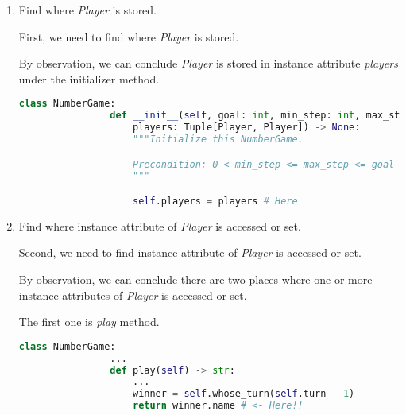 \documentclass[12pt]{article}
\begin{document}
\begin{enumerate}[1.]
\begin{mdframed}
        \begin{enumerate}[1.]
            \item Find where \textit{Player} is stored.

            \bigskip

            \begin{mdframed}

            First, we need to find where \textit{Player} is stored.

            \bigskip

            By observation, we can conclude \textit{Player} is stored in
            instance attribute \textit{players} under the initializer method.

            \begin{lstlisting}[language=Python]
            class NumberGame:
                def __init__(self, goal: int, min_step: int, max_step: int,
                    players: Tuple[Player, Player]) -> None:
                    """Initialize this NumberGame.

                    Precondition: 0 < min_step <= max_step <= goal
                    """

                    self.players = players # Here
            \end{lstlisting}


            \end{mdframed}

            \item Find where instance attribute of \textit{Player} is accessed or set.

            \bigskip

            \begin{mdframed}

            Second, we need to find instance attribute of \textit{Player} is accessed or set.

            \bigskip

            By observation, we can conclude there are two places where one or more instance
            attributes of \textit{Player} is accessed or set.

            \bigskip

            The first one is \textit{play} method.

            \begin{lstlisting}[language=Python]
            class NumberGame:
                ...
                def play(self) -> str:
                    ...
                    winner = self.whose_turn(self.turn - 1)
                    return winner.name # <- Here!!
            \end{lstlisting}


\end{mdframed}
\end{enumerate}
\end{mdframed}
\end{enumerate}
\end{document}
